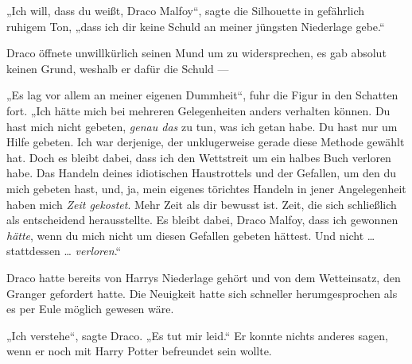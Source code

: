 „Ich will, dass du weißt, Draco Malfoy“, sagte die Silhouette in gefährlich ruhigem Ton, „dass ich dir keine Schuld an meiner jüngsten Niederlage gebe.“

Draco öffnete unwillkürlich seinen Mund um zu widersprechen, es gab absolut keinen Grund, weshalb er dafür die Schuld —

„Es lag vor allem an meiner eigenen Dummheit“, fuhr die Figur in den Schatten fort.
„Ich hätte mich bei mehreren Gelegenheiten anders verhalten können. Du hast mich nicht gebeten, \emph{genau das} zu tun, was ich getan habe. Du hast nur um Hilfe gebeten. Ich war derjenige, der unklugerweise gerade diese Methode gewählt hat. Doch es bleibt dabei, dass ich den Wettstreit um ein halbes Buch verloren habe. Das Handeln deines idiotischen Haustrottels und der Gefallen, um den du mich gebeten hast, und, ja, mein eigenes törichtes Handeln in jener Angelegenheit haben mich \emph{Zeit gekostet}. Mehr Zeit als dir bewusst ist. Zeit, die sich schließlich als entscheidend herausstellte. Es bleibt dabei, Draco Malfoy, dass ich gewonnen \emph{hätte}, wenn du mich nicht um diesen Gefallen gebeten hättest. Und nicht … stattdessen … \emph{verloren}.“

Draco hatte bereits von Harrys Niederlage gehört und von dem Wetteinsatz, den Granger gefordert hatte. Die Neuigkeit hatte sich schneller herumgesprochen als es per Eule möglich gewesen wäre.

„Ich verstehe“, sagte Draco.
„Es tut mir leid.“ Er konnte nichts anderes sagen, wenn er noch mit Harry Potter befreundet sein wollte.


